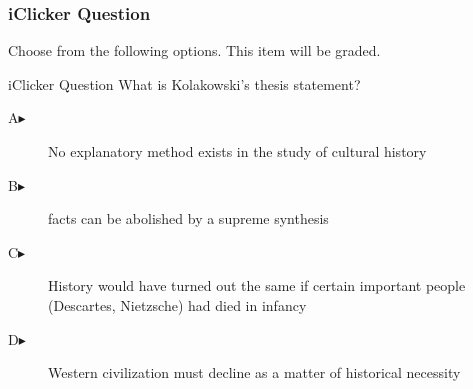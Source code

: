\begin{frame}
  \frametitle{iClicker Question}
Choose from the following options. This item will be graded.
\begin{block}{iClicker Question}
What is Kolakowski's thesis statement?
\end{block}
\begin{description}
\item[A\hspace{.2in}$\blacktriangleright$] No explanatory method exists in the study of cultural history
\item[B\hspace{.2in}$\blacktriangleright$] facts can be abolished by a supreme synthesis
\item[C\hspace{.2in}$\blacktriangleright$] History would have turned out the same if certain important people (Descartes, Nietzsche) had died in infancy
\item[D\hspace{.2in}$\blacktriangleright$] Western civilization must decline as a matter of historical necessity
\end{description}
\end{frame}
